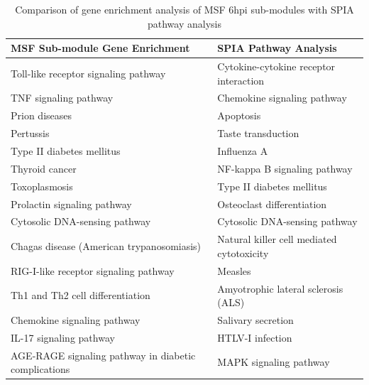 \documentclass[twocolumn]{article}
\begin{document}
\begin{table}[]
	\centering
	\caption{Comparison of gene enrichment analysis of MSF 6hpi sub-modules with SPIA pathway analysis}
	\label{Comparison of gene enrichment analysis of MSF 6hpi sub-modules with SPIA pathway analysis}
	\begin{tabular}{|l|l|}
		\hline
		\textbf{MSF Sub-module Gene Enrichment}              & \textbf{SPIA Pathway Analysis}            \\ \hline
		Toll-like receptor signaling pathway                 & Cytokine-cytokine receptor interaction    \\ \hline
		TNF signaling pathway                                & Chemokine signaling pathway               \\ \hline
		Prion diseases                                       & Apoptosis                                 \\ \hline
		Pertussis                                            & Taste transduction                        \\ \hline
		Type II diabetes mellitus                            & Influenza A                               \\ \hline
		Thyroid cancer                                       & NF-kappa B signaling pathway              \\ \hline
		Toxoplasmosis                                        & Type II diabetes mellitus                 \\ \hline
		Prolactin signaling pathway                          & Osteoclast differentiation                \\ \hline
		Cytosolic DNA-sensing pathway                        & Cytosolic DNA-sensing pathway             \\ \hline
		Chagas disease (American trypanosomiasis)            & Natural killer cell mediated cytotoxicity \\ \hline
		RIG-I-like receptor signaling pathway                & Measles                                   \\ \hline
		Th1 and Th2 cell differentiation                     & Amyotrophic lateral sclerosis (ALS)       \\ \hline
		Chemokine signaling pathway                          & Salivary secretion                        \\ \hline
		IL-17 signaling pathway                              & HTLV-I infection                          \\ \hline
		AGE-RAGE signaling pathway in diabetic complications & MAPK signaling pathway                    \\ \hline

\end{tabular}
\end{table}
\end{document}
